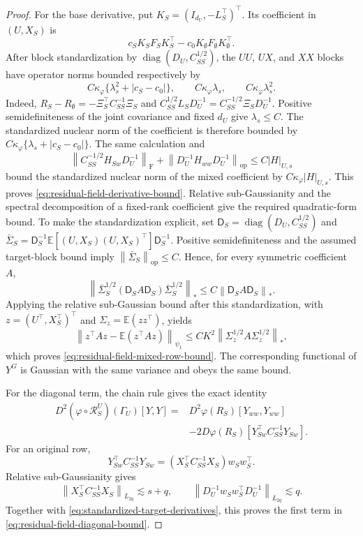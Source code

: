\documentclass[a4paper,11pt,english]{article}
\newcommand{\E}{\mathbb E}
\newcommand{\norm}[1]{\left\lVert #1\right\rVert}
\begin{document}
\begin{proof}
For the base derivative, put $K_S=(I_{d_U},-L_S^\top)^\top$.  Its coefficient
in $(U,X_S)$ is
\[
 c_SK_SF_SK_S^\top-c_0K_\emptyset F_\emptyset K_\emptyset^\top.
\]
After block standardization by $\operatorname{diag}(D_U,C_{SS}^{1/2})$,
the $UU$, $UX$, and $XX$ blocks have operator norms bounded respectively
by
\[
 C\kappa_\varphi\{\lambda_s^2+|c_S-c_0|\},
 \qquad C\kappa_\varphi\lambda_s,
 \qquad C\kappa_\varphi\lambda_s^2.
\]
Indeed,
$R_S-R_\emptyset=-\Xi_S^\top C_{SS}^{-1}\Xi_S$ and
$C_{SS}^{1/2}L_SD_U^{-1}=C_{SS}^{-1/2}\Xi_SD_U^{-1}$.
Positive semidefiniteness of the joint covariance and fixed $d_U$ give
$\lambda_s\le C$.  The standardized nuclear norm of the coefficient is
therefore bounded by
$C\kappa_\varphi\{\lambda_s+|c_S-c_0|\}$.  The same calculation and
\[
 \norm{C_{SS}^{-1/2}H_{Sw}D_U^{-1}}_{\mathrm F}
 +\norm{D_U^{-1}H_{ww}D_U^{-1}}_{\mathrm{op}}
 \le C|H|_{U,s}
\]
bound the standardized nuclear norm of the mixed coefficient by
$C\kappa_\varphi|H|_{U,s}$.  This proves
\eqref{eq:residual-field-derivative-bound}.  Relative sub-Gaussianity and
the spectral decomposition of a fixed-rank coefficient give the required
quadratic-form bound.  To make the standardization explicit, set
$\mathsf D_S=\operatorname{diag}(D_U,C_{SS}^{1/2})$ and
$\bar\Sigma_S=\mathsf D_S^{-1}\E[(U,X_S)(U,X_S)^\top]\mathsf D_S^{-1}$.
Positive semidefiniteness and the assumed target-block bound imply
$\norm{\bar\Sigma_S}_{\mathrm{op}}\le C$.  Hence, for every symmetric
coefficient $A$,
\[
 \norm{\bar\Sigma_S^{1/2}(\mathsf D_SA\mathsf D_S)
       \bar\Sigma_S^{1/2}}_*
 \le C\norm{\mathsf D_SA\mathsf D_S}_*.
\]
Applying the relative sub-Gaussian bound after this standardization, with
$z=(U^\top,X_S^\top)^\top$ and $\Sigma_z=\E(zz^\top)$, yields
\[
 \norm{z^\top Az-\E(z^\top Az)}_{\psi_1}
 \le CK^2\norm{\Sigma_z^{1/2}A\Sigma_z^{1/2}}_*,
\]
which proves \eqref{eq:residual-field-mixed-row-bound}.  The corresponding
functional of $Y^G$ is Gaussian with the same variance and obeys the same
bound.

For the diagonal term, the chain rule gives the exact identity
\begin{equation}\label{eq:residual-diagonal-formula}
\begin{split}
 D^2(\varphi\circ\mathcal R_S^U)(\Gamma_U)[Y,Y]
 ={}&D^2\varphi(R_S)[Y_{ww},Y_{ww}]\\
 &-2D\varphi(R_S)
 [Y_{Sw}^\top C_{SS}^{-1}Y_{Sw}].
\end{split}
\end{equation}
For an original row,
\[
 Y_{Sw}^\top C_{SS}^{-1}Y_{Sw}
 =(X_S^\top C_{SS}^{-1}X_S)w_Sw_S^\top.
\]
Relative sub-Gaussianity gives
\[
 \norm{X_S^\top C_{SS}^{-1}X_S}_{L_{2q}}\lesssim s+q,
 \qquad
 \norm{D_U^{-1}w_Sw_S^\top D_U^{-1}}_{L_{2q}}\lesssim q.
\]
Together with \eqref{eq:standardized-target-derivatives}, this proves the
first term in \eqref{eq:residual-field-diagonal-bound}.


\end{proof}
\end{document}
